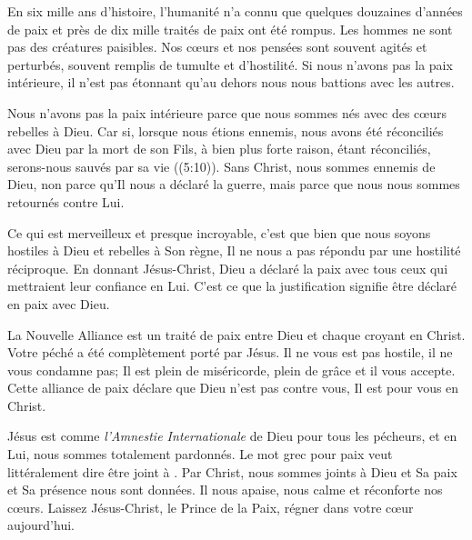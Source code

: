 

En six mille ans d'histoire, l'humanité n'a connu que quelques douzaines d'années de paix et près de dix mille traités de paix ont été rompus. Les hommes ne sont pas des créatures paisibles. Nos cœurs et nos pensées sont souvent agités et perturbés, souvent remplis de tumulte et d'hostilité. Si nous n'avons pas la paix intérieure, il n'est pas étonnant qu'au dehors nous nous battions avec les autres.

Nous n'avons pas la paix intérieure parce que nous sommes nés avec des cœurs rebelles à Dieu.
 \Og Car si, lorsque nous étions ennemis, nous avons été réconciliés avec Dieu par la mort de son Fils, à bien plus forte raison, étant réconciliés, serons-nous sauvés par sa vie \Fg{} ((5:10)). Sans Christ, nous sommes ennemis de Dieu, non parce qu'Il nous a déclaré la guerre, mais parce que nous nous sommes retournés contre Lui.

Ce qui est merveilleux et presque incroyable, c'est que bien que nous soyons hostiles à Dieu et rebelles à Son règne, Il ne nous a pas répondu par une hostilité réciproque. En donnant Jésus-Christ, Dieu a déclaré la paix avec tous ceux qui mettraient leur confiance en Lui. C'est ce que la justification signifie \ocadr être déclaré en paix avec Dieu.

La Nouvelle Alliance est un traité de paix entre Dieu et chaque croyant en Christ. Votre péché a été complètement porté par Jésus. Il ne vous est pas hostile, il ne vous condamne pas; Il est plein de miséricorde, plein de grâce et il vous accepte. Cette alliance de paix déclare que Dieu n'est pas contre vous, Il est pour vous en Christ.

Jésus est comme \emph{l'Amnestie Internationale} de Dieu pour tous les pécheurs, et en Lui, nous sommes totalement pardonnés. Le mot grec pour \Og paix \Fg{} veut littéralement dire \Og être joint à \Fg{}. Par Christ, nous sommes joints à Dieu et Sa paix et Sa présence nous sont données. Il nous apaise, nous calme et réconforte nos cœurs. Laissez Jésus-Christ, le Prince de la Paix, régner dans votre cœur aujourd'hui.


\begin{dvquotes}
\end{dvquotes}

